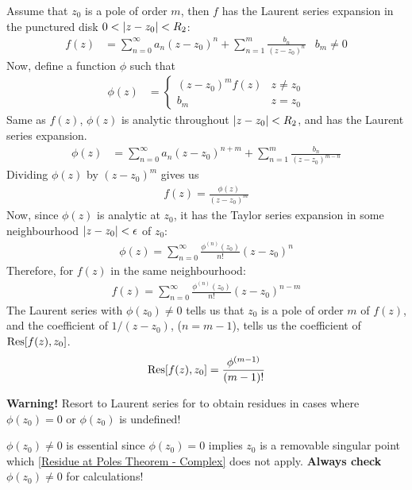 \documentclass[12pt, english]{book}
\makeatletter
\renewenvironment{proof}[1][\proofname]{\par
	\pushQED{\qed}%
	\normalfont \topsep6\p@\@plus6\p@\relax
	\list{}{%
		\settowidth{\leftmargin}{\itshape\proofname:\hskip\labelsep}%
		\setlength{\labelwidth}{0pt}%
		\setlength{\itemindent}{-\leftmargin}%
		}%
	\item[\hskip\labelsep\itshape#1\@addpunct{:}]\ignorespaces
	}{\popQED\endlist\@endpefalse}
\makeatother
\begin{document}
	\begin{proof}
		Assume that \(z_0\) is a pole of order \(m\), then \(f\) has the Laurent series expansion in the punctured disk \(0 < \abs{z-z_0} < R_2\):
		\begin{align*}
			f(z) &= \sum_{n=0}^{\infty} a_n (z-z_0)^n + \sum_{n=1}^{m} \frac{b_n}{(z-z_0)^n}
				& b_m \neq 0
		\end{align*}
		Now, define a function \(\phi\) such that 
		\begin{align*}
			\phi(z) &=
			\begin{cases}
				(z-z_0)^m f(z) & z \neq z_0 \\
				b_m				& z=z_0
			\end{cases}
		\end{align*}
		Same as \(f(z)\), \(\phi(z)\) is analytic throughout \(\abs{z-z_0} < R_2\), and has the Laurent series expansion.
		\begin{align*}
			\phi(z) &= \sum_{n=0}^{\infty} a_n (z-z_0)^{n+m} + \sum_{n=1}^{m} \frac{b_n}{(z-z_0)^{m-n}}
		\end{align*}
		Dividing \(\phi(z)\) by \((z-z_0)^m\) gives us 
		\begin{align*}
			f(z) = \frac{\phi(z)}{(z-z_0)^m}
		\end{align*}
		Now, since \(\phi(z)\) is analytic at \(z_0\), it has the Taylor series expansion in some neighbourhood \(\abs{z-z_0}< \epsilon\) of \(z_0\):
		\begin{align*}
			\phi(z) = \sum_{n=0}^{\infty} \frac{\phi^{(n)}(z_0)}{n!} (z-z_0)^n
		\end{align*}
		Therefore, for \(f(z)\) in the same neighbourhood:
		\begin{align*}
			f(z) = \sum_{n=0}^{\infty} \frac{\phi^{(n)}(z_0)}{n!} (z-z_0)^{n-m}
		\end{align*}
		The Laurent series with \(\phi(z_0) \neq 0\) tells us that \(z_0\) is a pole of order \(m\) of \(f(z)\), and the coefficient of \(1/(z-z_0)\), (\(n=m-1\)), tells us the coefficient of \(\Res[f(z),z_0]\).
		\begin{align*}
			\Res[f(z),z_0] = \frac{\phi^{(m-1)}}{(m-1)!}
		\end{align*}
	\end{proof}

	{\color{Red} \textbf{Warning!} Resort to Laurent series for to obtain residues in cases where \(\phi(z_0) = 0\) or \(\phi(z_0)\) is undefined!}

	\(\phi(z_0) \neq 0\) is essential since \(\phi(z_0) = 0\) implies \(z_0\) is a removable singular point which \cref{Residue at Poles Theorem - Complex} does not apply. \textbf{Always check} \(\phi(z_0) \neq 0\) for calculations! 
\end{document}
